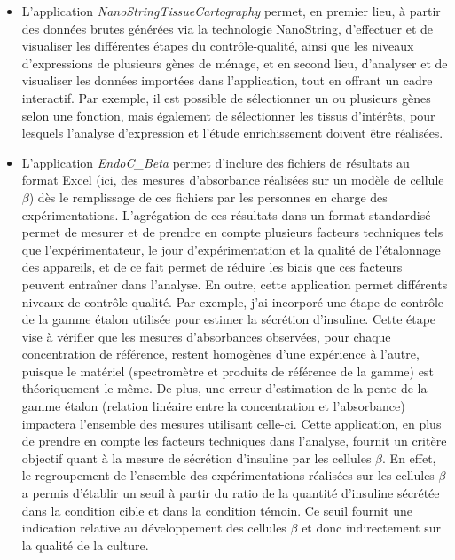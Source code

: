 \documentclass[11pt,a4paper,notrimn]{krantz}
\theoremstyle{definition}
\theoremstyle{definition}
\theoremstyle{remark}
\begin{document}
\begin{itemize}
  \begin{itemize}
  \item
    L'application \emph{NanoStringTissueCartography} permet, en premier
    lieu, à partir des données brutes générées via la technologie
    NanoString, d'effectuer et de visualiser les différentes étapes du
    contrôle-qualité, ainsi que les niveaux d'expressions de plusieurs
    gènes de ménage, et en second lieu, d'analyser et de visualiser les
    données importées dans l'application, tout en offrant un cadre
    interactif. Par exemple, il est possible de sélectionner un ou
    plusieurs gènes selon une fonction, mais également de sélectionner
    les tissus d'intérêts, pour lesquels l'analyse d'expression et
    l'étude enrichissement doivent être réalisées.
  \item
    L'application \emph{EndoC\_Beta} permet d'inclure des fichiers de
    résultats au format Excel (ici, des mesures d'absorbance réalisées
    sur un modèle de cellule \(\beta\)) dès le remplissage de ces
    fichiers par les personnes en charge des expérimentations.
    L'agrégation de ces résultats dans un format standardisé permet de
    mesurer et de prendre en compte plusieurs facteurs techniques tels
    que l'expérimentateur, le jour d'expérimentation et la qualité de
    l'étalonnage des appareils, et de ce fait permet de réduire les
    biais que ces facteurs peuvent entraîner dans l'analyse. En outre,
    cette application permet différents niveaux de contrôle-qualité. Par
    exemple, j'ai incorporé une étape de contrôle de la gamme étalon
    utilisée pour estimer la sécrétion d'insuline. Cette étape vise à
    vérifier que les mesures d'absorbances observées, pour chaque
    concentration de référence, restent homogènes d'une expérience à
    l'autre, puisque le matériel (spectromètre et produits de référence
    de la gamme) est théoriquement le même. De plus, une erreur
    d'estimation de la pente de la gamme étalon (relation linéaire entre
    la concentration et l'absorbance) impactera l'ensemble des mesures
    utilisant celle-ci. Cette application, en plus de prendre en compte
    les facteurs techniques dans l'analyse, fournit un critère objectif
    quant à la mesure de sécrétion d'insuline par les cellules
    \(\beta\). En effet, le regroupement de l'ensemble des
    expérimentations réalisées sur les cellules \(\beta\) a permis
    d'établir un seuil à partir du ratio de la quantité d'insuline
    sécrétée dans la condition cible et dans la condition témoin. Ce
    seuil fournit une indication relative au développement des cellules
    \(\beta\) et donc indirectement sur la qualité de la culture.
  \end{itemize}
\end{itemize}
\end{document}
